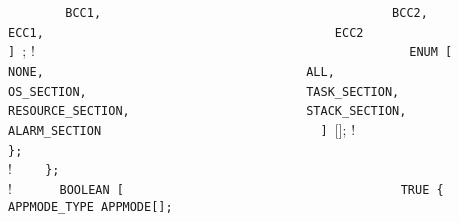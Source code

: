 {{{{{{{\lstinline!        BCC1,                                ! \newline
\lstinline!        BCC2,                                ! \newline
\lstinline!        ECC1,                                ! \newline
\lstinline!        ECC2                                 ! \newline
\lstinline!      ] !;            ! \newline
\lstinline!                                             ! \newline
\lstinline!      ENUM [                                 ! \newline
\lstinline!	   NONE,                                ! \newline
\lstinline!	   ALL,                                 ! \newline
\lstinline!	   OS_SECTION,                          ! \newline
\lstinline!	   TASK_SECTION,                        ! \newline
\lstinline!	   RESOURCE_SECTION,                    ! \newline
\lstinline!	   STACK_SECTION,                       ! \newline
\lstinline!	   ALARM_SECTION                        ! \newline
\lstinline!      ] ![];        ! \newline
\lstinline!                                             ! \newline
\lstinline!    };                                       ! \newline
\lstinline!                                             ! \newline
\lstinline!    ! {                   ! \newline
\lstinline!    };                                       ! \newline
\lstinline!                                             ! \newline
\lstinline!    ! {                      ! \newline
\lstinline!      BOOLEAN [                              ! \newline
\lstinline!        TRUE {                               ! \newline
\lstinline!          APPMODE_TYPE APPMODE[];            ! \newline
}}}}}}}}}
